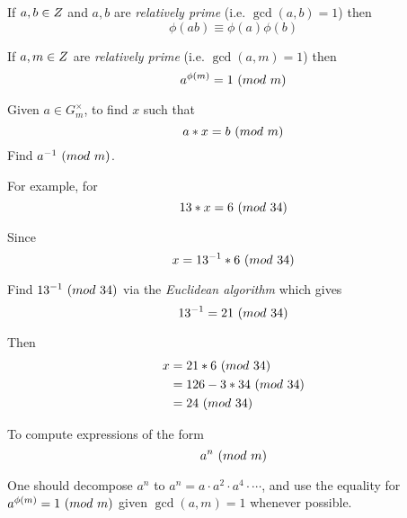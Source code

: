 \begin{theorem}
    If $a, b \in \relax{Z}$ and $a, b$ are \textit{relatively prime} (i.e. $\gcd(a, b) = 1$) then
    \begin{equation}
        \phi(ab) \equiv \phi(a) \phi(b)
    \end{equation}
\end{theorem}

\begin{theorem}
    If $a, m \in \relax{Z}$ are \textit{relatively prime} (i.e. $\gcd(a, m) = 1$) then
    \begin{equation}
        a^{\phi(m)} = 1 \ (\relax{mod}\ m)
    \end{equation}
\end{theorem}

\begin{remark}
    Given $a \in G^{\times}_{m}$, to find $x$ such that 
    \begin{equation}
        a \ast x = b \ (\relax{mod}\ m)
    \end{equation}
    Find ${a}^{-1} \ (\relax{mod}\ m)$.
    
    For example, for
    \begin{equation}
        13 \ast x = 6 \ (\relax{mod}\ 34)
    \end{equation}
    
    Since
    \begin{equation}
        x = {13}^{-1} \ast 6 \ (\relax{mod}\ 34)
    \end{equation}
    
    Find ${13}^{-1} \ (\relax{mod}\ 34)$ via the \textit{Euclidean algorithm} which gives
    \begin{equation}
        {13}^{-1} = 21 \ (\relax{mod}\ 34)
    \end{equation}
    
    Then
    \begin{align}
        x &= 21 \ast 6 \ (\relax{mod}\ 34) \\
          &= 126 - 3 \ast 34 \ (\relax{mod}\ 34) \\
          &= 24 \ (\relax{mod}\ 34)
    \end{align}
\end{remark}

\begin{remark}
    To compute expressions of the form
    \begin{equation}
        a^n \ (\relax{mod}\ m)
    \end{equation}
    
    One should decompose $a^n$ to $a^n = a \cdot a^2 \cdot a^4 \cdot \cdots$, and use the equality for $a^{\phi(m)} = 1 \ (\relax{mod}\ m)$ given $\gcd(a, m) = 1$ whenever possible.
\end{remark}
